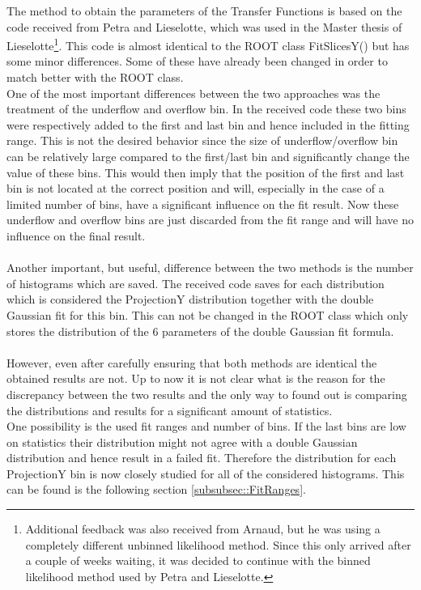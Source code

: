 The method to obtain the parameters of the Transfer Functions is based on the code received from Petra and Lieselotte, which was used in the Master thesis of Lieselotte\footnote{Additional feedback was also received from Arnaud, but he was using a completely different unbinned likelihood method. Since this only arrived after a couple of weeks waiting, it was decided to continue with the binned likelihood method used by Petra and Lieselotte.}.
This code is almost identical to the ROOT class FitSlicesY() but has some minor differences. Some of these have already been changed in order to match better with the ROOT class.\\
One of the most important differences between the two approaches was the treatment of the underflow and overflow bin. In the received code these two bins were respectively added to the first and last bin and hence included in the fitting range. This is not the desired behavior since the size of underflow/overflow bin can be relatively large compared to the first/last bin and significantly change the value of these bins. This would then imply that the position of the first and last bin is not located at the correct position and will, especially in the case of a limited number of bins, have a significant influence on the fit result.
Now these underflow and overflow bins are just discarded from the fit range and will have no influence on the final result.\\
\\
Another important, but useful, difference between the two methods is the number of histograms which are saved. The received code saves for each distribution which is considered the ProjectionY distribution together with the double Gaussian fit for this bin. This can not be changed in the ROOT class which only stores the distribution of the 6 parameters of the double Gaussian fit formula.\\
\\
However, even after carefully ensuring that both methods are identical the obtained results are not.
Up to now it is not clear what is the reason for the discrepancy between the two results and the only way to found out is comparing the distributions and results for a significant amount of statistics.\\
One possibility is the used fit ranges and number of bins. If the last bins are low on statistics their distribution might not agree with a double Gaussian distribution and hence result in a failed fit. Therefore the distribution for each ProjectionY bin is now closely studied for all of the considered histograms. This can be found is the following section \ref{subsubsec::FitRanges}.

